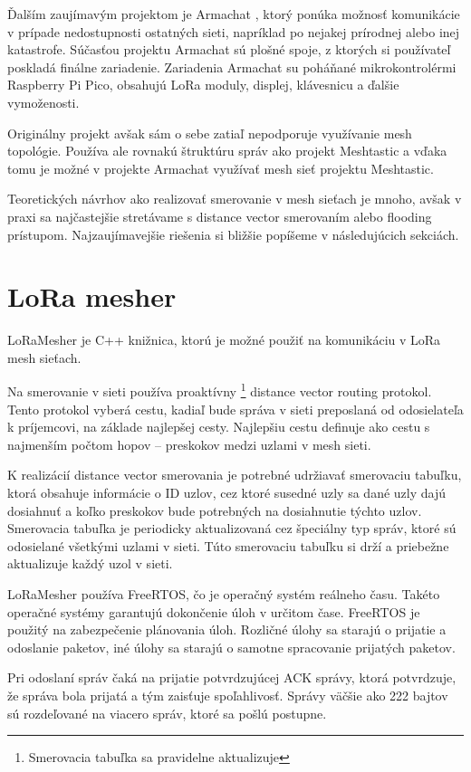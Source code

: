 \documentclass[slovak,master]{diploma}
\begin{document}
Ďalším zaujímavým projektom je Armachat \cite{armachat}, ktorý ponúka možnosť komunikácie v prípade nedostupnosti ostatných sieti, napríklad po nejakej prírodnej alebo inej katastrofe.
Súčasťou projektu Armachat sú plošné spoje, z ktorých si používateľ poskladá finálne zariadenie.
Zariadenia Armachat su poháňané mikrokontrolérmi Raspberry Pi Pico, obsahujú LoRa moduly, displej, klávesnicu a ďalšie vymoženosti.

Originálny projekt avšak sám o sebe zatiaľ nepodporuje využívanie mesh topológie. Používa ale rovnakú štruktúru správ ako projekt Meshtastic a vďaka tomu je možné 
v projekte Armachat využívať mesh sieť projektu Meshtastic.

Teoretických návrhov ako realizovať smerovanie v mesh sieťach je mnoho, avšak v praxi sa najčastejšie stretávame s 
distance vector smerovaním alebo flooding prístupom. Najzaujímavejšie riešenia si bližšie popíšeme 
v následujúcich sekciách.

\section{LoRa mesher}
LoRaMesher \cite{loramesher} \cite{9930341} je C++ knižnica, ktorú je možné použiť na komunikáciu v LoRa mesh sieťach.

Na smerovanie v sieti používa proaktívny \footnote[1]{Smerovacia tabuľka sa pravidelne aktualizuje}  distance vector routing protokol. Tento protokol vyberá cestu, kadiaľ bude správa v sieti preposlaná od odosielateľa k príjemcovi, na základe 
najlepšej cesty. Najlepšiu cestu definuje ako cestu s najmenším počtom hopov -- preskokov medzi uzlami v mesh sieti.

K realizácií distance vector smerovania je potrebné udržiavať smerovaciu tabuľku, ktorá obsahuje informácie o ID uzlov, cez ktoré susedné uzly sa dané uzly dajú dosiahnuť a 
koľko preskokov bude potrebných na dosiahnutie týchto uzlov. Smerovacia tabuľka je periodicky aktualizovaná cez špeciálny typ správ, ktoré sú odosielané 
všetkými uzlami v sieti. Túto smerovaciu tabuľku si drží a priebežne aktualizuje každý uzol v sieti.

LoRaMesher používa FreeRTOS, čo je operačný systém reálneho času. Takéto operačné systémy garantujú dokončenie úloh v určitom čase.
FreeRTOS je použitý na zabezpečenie plánovania úloh. Rozličné úlohy sa starajú o prijatie a odoslanie paketov, iné úlohy sa starajú o samotne 
spracovanie prijatých paketov.

Pri odoslaní správ čaká na prijatie potvrdzujúcej ACK správy, ktorá potvrdzuje, 
že správa bola prijatá a tým zaisťuje spoľahlivosť. Správy väčšie ako 222 bajtov sú rozdeľované na viacero správ, ktoré sa pošlú postupne.
\end{document}
